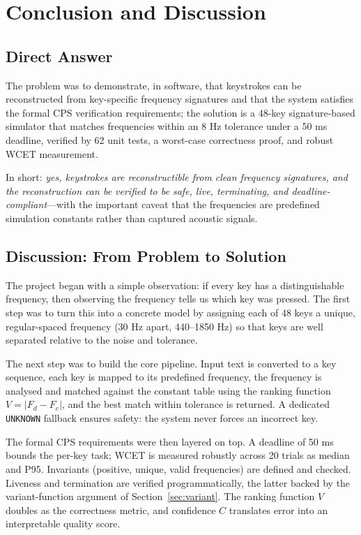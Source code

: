 \documentclass[11pt,a4paper]{article}
\newcommand{\Key}[1]{\texttt{#1}}
\begin{document}
\section{Conclusion and Discussion}
\label{sec:conclusion}

\subsection{Direct Answer}

The problem was to demonstrate, in software, that keystrokes can be
reconstructed from key-specific frequency signatures and that the system
satisfies the formal CPS verification requirements; the solution is a 48-key
signature-based simulator that matches frequencies within an 8 Hz tolerance
under a 50 ms deadline, verified by 62 unit tests, a worst-case correctness
proof, and robust WCET measurement.

In short: \emph{yes, keystrokes are reconstructible from clean frequency
signatures, and the reconstruction can be verified to be safe, live,
terminating, and deadline-compliant}---with the important caveat that the
frequencies are predefined simulation constants rather than captured acoustic
signals.

\subsection{Discussion: From Problem to Solution}

The project began with a simple observation: if every key has a distinguishable
frequency, then observing the frequency tells us which key was pressed. The
first step was to turn this into a concrete model by assigning each of 48 keys a
unique, regular-spaced frequency (30 Hz apart, 440--1850 Hz) so that keys are
well separated relative to the noise and tolerance.

The next step was to build the core pipeline. Input text is converted to a key
sequence, each key is mapped to its predefined frequency, the frequency is
analysed and matched against the constant table using the ranking function
$V = |F_d - F_e|$, and the best match within tolerance is returned. A dedicated
\Key{UNKNOWN} fallback ensures safety: the system never forces an incorrect
key.

The formal CPS requirements were then layered on top. A deadline of 50 ms bounds
the per-key task; WCET is measured robustly across 20 trials as median and P95.
Invariants (positive, unique, valid frequencies) are defined and checked.
Liveness and termination are verified programmatically, the latter backed by the
variant-function argument of Section~\ref{sec:variant}. The ranking function $V$
doubles as the correctness metric, and confidence $C$ translates error into an
interpretable quality score.
\end{document}
